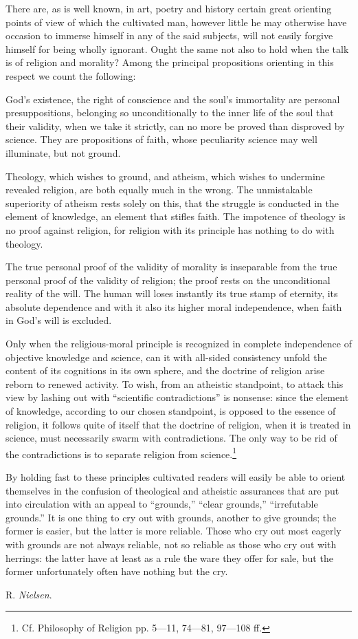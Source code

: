 \documentclass[12pt,a4paper,openany]{book}
\renewcommand{\thefootnote}{\arabic{footnote})}   %
\newcommand{\opage}[1]{\marginnote{\footnotesize\textit{[#1]}}}
\newcommand{\signature}[1]{\par\smallskip\hfill #1\hspace*{2em}\par}
\begin{document}
There are, as is well known, in art, poetry and history
certain great orienting points of view of which the
cultivated man, however little he may otherwise have occasion to immerse
himself in any of the said subjects, will not easily forgive
himself for being wholly ignorant. Ought the
same not also to hold when the talk is of religion
and morality? Among the principal propositions
orienting in this respect we count the following:

God's existence, the right of conscience and the soul's
immortality are personal presuppositions, belonging so
unconditionally to the inner life of the soul that their validity, when
we take it strictly, can no more be proved than disproved
by science. They are propositions of faith, whose
peculiarity science may well illuminate, but not
ground.

Theology, which wishes to ground, and atheism, which
wishes to undermine revealed religion, are both equally
\setcounter{footnote}{0}%
\opage{553}much in the wrong. The unmistakable superiority of atheism
rests solely on this, that the struggle is conducted in the element of knowledge,
an element that stifles faith. The impotence of theology is
no proof against religion, for religion with its principle
has nothing to do with theology.

The true personal proof of the validity of morality
is inseparable from the true personal proof of
the validity of religion; the proof rests on the unconditional
reality of the will. The human will loses
instantly its true stamp of eternity, its absolute dependence
and with it also its higher moral independence,
when faith in God's will is excluded.

Only when the religious-moral principle is recognized
in complete independence of objective knowledge and
science, can it with all-sided consistency unfold the content
of its cognitions in its own sphere, and the doctrine of religion
arise reborn to renewed activity. To wish, from
an atheistic standpoint, to attack this view by
lashing out with ``scientific contradictions'' is
nonsense: since the element of knowledge, according to our chosen standpoint,
is opposed to the essence of religion, it follows
quite of itself that the doctrine of religion, when it is treated
in science, must necessarily swarm with contradictions.
The only way to be rid of the contradictions is
to separate religion from science.{\renewcommand{\thefootnote}{*)}\footnote[1]{Cf. Philosophy of Religion pp. 5—11, 74---81, 97—108 ff.}}

By holding fast to these principles cultivated
readers will easily be able to orient themselves in the confusion of theological
and atheistic assurances that are put into circulation
with an appeal to ``grounds,'' ``clear grounds,''
\setcounter{footnote}{0}%
\opage{554}``irrefutable grounds.'' It is one thing to cry out with
grounds, another to give grounds; the former is easier,
but the latter is more reliable. Those who cry out most eagerly
with grounds are not always reliable, not so reliable
as those who cry out with herrings: the latter
have at least as a rule the ware they offer for sale, but the former
unfortunately often have nothing but the cry.

\signature{R. \emph{Nielsen}.}
\end{document}
